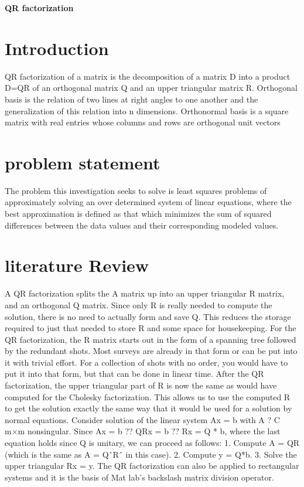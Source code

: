 \documentclass[a4paper,1pt]{article}
\begin{document}
\begin{title}
\huge{\bfseries QR factorization}
\end{title}
\author{BAMUZIBIRE SOLOMON MUKISA,14/U/3938/PS,214015782}
\section{Introduction}
QR factorization of a matrix is the decomposition of a matrix D into a product D=QR of an orthogonal matrix Q and an upper triangular matrix R.
Orthogonal basis is the relation of two lines at right angles to one another and the generalization of this relation into n dimensions.
Orthonormal basis is a square matrix with real entries whose columns and rows are orthogonal unit vectors
\section{problem statement}
The problem this investigation seeks to solve is least squares problems of approximately solving an over determined system of linear equations, where the best approximation is defined as that which minimizes the sum of squared differences between the data values and their corresponding modeled values.

\section{literature Review}
A QR factorization splits the A matrix up into an upper triangular R matrix, and an orthogonal Q matrix. Since only R is really needed to compute the solution, there is no need to actually form and save Q. This reduces the storage required to just that needed to store R and some space for housekeeping.
For the QR factorization, the R matrix starts out in the form of a spanning tree followed by the redundant shots. Most surveys are already in that form or can be put into it with trivial effort. For a collection of shots with no order, you would have to put it into that form, but that can be done in linear time.
After the QR factorization, the upper triangular part of R is now the same as would have computed for the Cholesky factorization. This allows us to use the computed R to get the solution exactly the same way that it would be used for a solution by normal equations.
Consider solution of the linear system Ax = b with A ? C m×m nonsingular.
Since Ax = b ?? QRx = b ?? Rx = Q * b, where the last equation holds since Q is unitary, we can proceed as follows:
 1. Compute A = QR (which is the same as A = QˆRˆ in this case).
 2. Compute y = Q*b.
 3. Solve the upper triangular Rx = y.
 The QR factorization can also be applied to rectangular systems and it is the basis of Mat lab’s backslash matrix division operator.
\end{document}
